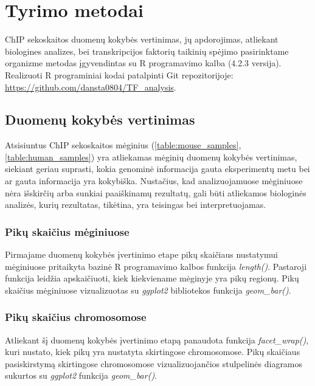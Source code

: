 \documentclass[12pt]{article}
\begin{document}
\newpage


\section{Tyrimo metodai}
ChIP sekoskaitos duomenų kokybės vertinimas, jų apdorojimas, atliekant
biologines analizes, bei transkripcijos faktorių taikinių spėjimo pasirinktame
organizme metodas įgyvendintas su R programavimo kalba \cite{R} (4.2.3 versija).
Realizuoti R programiniai kodai patalpinti Git repozitorijoje:
\small{\url{https://github.com/dansta0804/TF\_analysis}}.



\subsection{Duomenų kokybės vertinimas}
Atsisiuntus ChIP sekoskaitos mėginius (\ref{table:mouse_samples},
\ref{table:human_samples}) yra atliekamas mėginių duomenų kokybės
vertinimas, siekiant geriau suprasti, kokia genominė informacija gauta
eksperimentų metu bei ar gauta informacija yra kokybiška. Nustačius, kad
analizuojamuose mėginiuose nėra išskirčių arba sunkiai paaiškinamų rezultatų,
gali būti atliekamos biologinės analizės, kurių rezultatas, tikėtina, yra
teisingas bei interpretuojamas.

\subsubsection*{Pikų skaičius mėginiuose}
Pirmajame duomenų kokybės įvertinimo etape pikų skaičiaus nustatymui mėginiuose
pritaikyta bazinė R programavimo kalbos funkcija \emph{length()}. Pastaroji
funkcija leidžia apskaičiuoti, kiek kiekviename mėginyje yra pikų regionų.
Pikų skaičius mėginiuose vizualizuotas su \emph{ggplot2}
\cite{GGPLOT2} bibliotekos funkcija \emph{geom\_bar()}.

\subsubsection*{Pikų skaičius chromosomose}
Atliekant šį duomenų kokybės įvertinimo etapą panaudota funkcija
\emph{facet\_wrap()}, kuri nustato, kiek pikų yra nustatyta skirtingose
chromosomose. Pikų skaičiaus pasiskirstymą skirtingose chromosomose
vizualizuojančios stulpelinės diagramos sukurtos su \emph{ggplot2} funkcija
\emph{geom\_bar()}.
\end{document}

